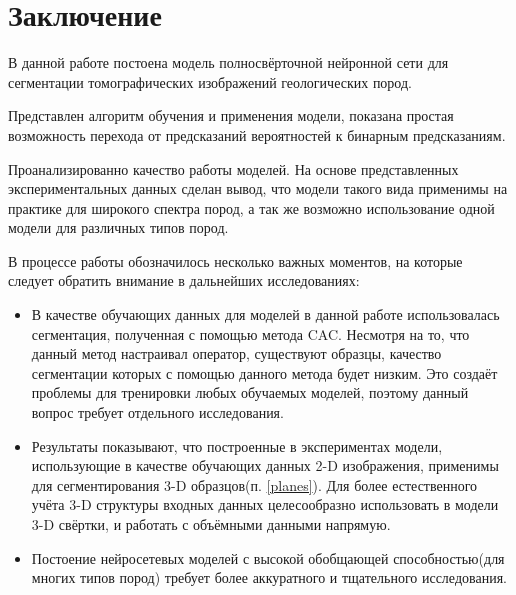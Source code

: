 \documentclass[12pt, a4paper]{extarticle}
\begin{document}
\clearpage

\newpage


\section{Заключение} \label{conclusion}

В данной работе постоена модель полносвёрточной нейронной сети для сегментации томографических изображений геологических пород.

Представлен алгоритм обучения и применения модели, показана простая возможность перехода от предсказаний вероятностей к бинарным предсказаниям. 

Проанализированно качество работы моделей. На основе представленных  экспериментальных данных сделан вывод, что модели такого вида применимы на практике для широкого спектра пород, а так же возможно использование одной модели для различных типов пород.

В процессе работы обозначилось несколько важных моментов, на которые следует обратить внимание в дальнейших исследованиях:

\begin{itemize}

	\item В качестве обучающих данных для моделей в данной работе использовалась сегментация, полученная с помощью метода CAC. Несмотря на то, что данный метод настраивал оператор, существуют образцы, качество сегментации которых с помощью данного метода будет  низким. Это создаёт проблемы для тренировки любых обучаемых моделей, поэтому данный вопрос требует отдельного исследования. 

	\item Результаты показывают, что построенные в экспериментах модели, использующие в качестве обучающих данных 2-D изображения, применимы для сегментирования 3-D образцов(п. \ref{planes}). Для более естественного учёта 3-D структуры входных данных целесообразно использовать в модели 3-D свёртки, и работать с объёмными данными напрямую. 
	
	\item Постоение нейросетевых моделей с высокой обобщающей способностью(для многих типов пород) требует более аккуратного и тщательного исследования. 

\end{itemize}

\newpage

\cleardoublepage
{}
\end{document}
